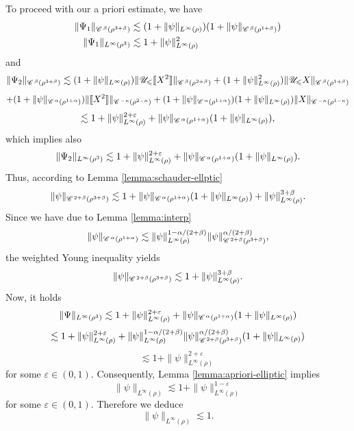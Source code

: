 \documentclass[a4paper,11pt]{article}
\renewcommand{\leq}{\leqslant}
\numberwithin{equation}{section}
\newcommand{\CC}{\mathscr{C} \hspace{.1em}}
\newcommand{\UU}{\mathscr{U}}
\newcommand{\8}{\infty}
\begin{document}
To proceed with our a priori estimate, we have
\begin{align}\label{eq:psi1}
\begin{aligned}
\| \Psi_1 \|_{\CC^{\beta} (\rho^{3 + \beta})}& \lesssim (1+\|\psi\|_{L^\infty(\rho)})(1+\|\psi\|_{\CC^{\beta}(\rho^{1+\beta})})\\
\| \Psi_1 \|_{L^{\infty} (\rho^3)} &\lesssim  1+
   \| \psi \|^2_{L^{\infty}
   (\rho)}
\end{aligned}
\end{align}
and
   \[ \| \Psi_2 \|_{\CC^{\beta} (\rho^{3 + \beta})} \lesssim (1+\|\psi\|_{L^\infty(\rho)} ) \|\UU_{\leq}\llbracket X^2\rrbracket\|_{\CC^{\beta}(\rho^{2+\beta})}+(1+\|\psi\|^2_{L^\infty(\rho)} ) \|\UU_{\leq} X\|_{\CC^{\beta}(\rho^{1+\beta})}\]
   \[+(1+\|\psi\|_{\CC^\alpha(\rho^{1+\alpha})} ) \|\llbracket X^2\rrbracket\|_{\CC^{-\kappa}(\rho^{2-\kappa})}+(1+\|\psi\|_{\CC^{\alpha}(\rho^{1+\alpha})} )(1+\|\psi\|_{L^\infty(\rho)}) \| X\|_{\CC^{-\kappa}(\rho^{1-\kappa})}\]
   \begin{equation}\label{eq:psi2}
   \lesssim 1+ \|\psi\|_{L^\infty(\rho)}^{2+\varepsilon}+\|\psi\|_{\CC^\alpha(\rho^{1+\alpha})}(1+\|\psi\|_{L^\infty(\rho)}),
   \end{equation}
   which implies also
\begin{equation}\label{eq:psi22}
\| \Psi_2 \|_{L^{\infty} (\rho^3)} \lesssim 1+\|\psi\|_{L^\infty(\rho)}^{2+\varepsilon}+\|\psi\|_{\CC^\alpha(\rho^{1+\alpha})}(1+\|\psi\|_{L^\infty(\rho)}). 
\end{equation}
Thus, according to Lemma \ref{lemma:schauder-ellptic}
\[
\|\psi\|_{\CC^{2+\beta}(\rho^{3+\beta})}\lesssim 1+\|\psi\|_{\CC^\alpha(\rho^{1+\alpha})}(1+\|\psi\|_{L^\infty(\rho)})+\|\psi\|_{L^\infty(\rho)}^{3+\beta} .\]
 Since we have due to Lemma \ref{lemma:interp}
 \[
\|\psi\|_{\CC^{\alpha}(\rho^{1+\alpha})} \lesssim \|\psi\|_{L^\infty(\rho)}^{1-\alpha/(2+\beta)}\|\psi\|^{\alpha/(2+\beta)}_{\CC^{2+\beta}(\rho^{3+\beta})},
\]
the weighted Young inequality yields
\[
\|\psi\|_{\CC^{2+\beta}(\rho^{3+\beta})} \lesssim 1+\|\psi\|_{L^\infty(\rho)}^{3+\beta}.
\]
Now, it holds
 \[ 
 \|\Psi\|_{L^\infty(\rho^3)}\lesssim 1+\|\psi\|_{L^\infty(\rho)}^{2+\varepsilon}
+\|\psi\|_{\CC^\alpha(\rho^{1+\alpha})} (1 + \|\psi\|_{L^\infty(\rho)}) \]
\[
\lesssim 1+\|\psi\|_{L^\infty(\rho)}^{2+\varepsilon}
+\|\psi\|_{L^\infty(\rho)}^{1-\alpha/(2+\beta)}\|\psi\|^{\alpha/(2+\beta)}_{\CC^{2+\beta}(\rho^{3+\beta})}(1 + \|\psi\|_{L^\infty(\rho)})
\]
\begin{equation}\label{eq:psi3}
\lesssim 1+\|\psi\|^{2+\varepsilon}_{L^\infty(\rho)}
\end{equation}
for some $\varepsilon\in (0,1)$.
Consequently, Lemma \ref{lemma:apriori-elliptic} implies 
\[
\|\psi\|_{L^\infty(\rho)}\lesssim 1+ \|\psi\|^{1-\varepsilon}_{L^\infty(\rho)}
\]
for some $\varepsilon\in (0,1)$. Therefore we deduce
\[
   \|\psi\|_{L^\infty(\rho)}\lesssim 1.
   \]
\end{document}
